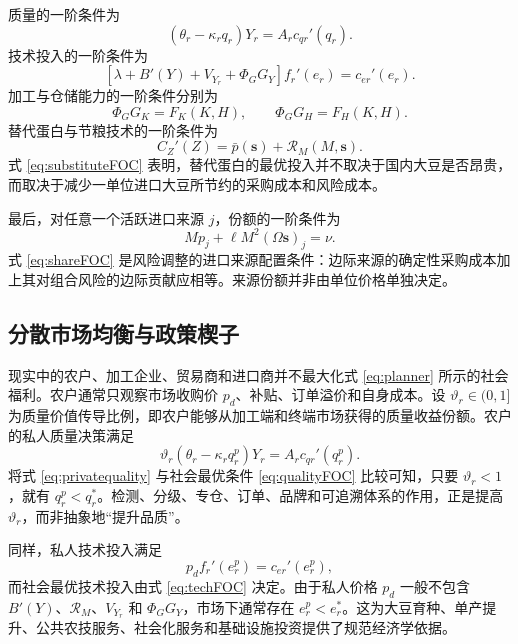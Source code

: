 \documentclass[UTF8,zihao=-4,fontset=fandol]{ctexart}
\numberwithin{equation}{section}
\theoremstyle{definition}
\theoremstyle{remark}
\begin{document}
质量的一阶条件为
\begin{equation}
 \left(\theta_r-\kappa_rq_r\right)Y_r=A_rc_{qr}'(q_r).
 \label{eq:qualityFOC}
\end{equation}
技术投入的一阶条件为
\begin{equation}
 \left[\lambda+B'(Y)+V_{Y_r}+\Phi_GG_Y\right]f_r'(e_r)=c_{er}'(e_r).
 \label{eq:techFOC}
\end{equation}
加工与仓储能力的一阶条件分别为
\begin{equation}
 \Phi_GG_K=F_K(K,H),\qquad \Phi_GG_H=F_H(K,H).
 \label{eq:capacityFOC}
\end{equation}
替代蛋白与节粮技术的一阶条件为
\begin{equation}
 C_Z'(Z)=\bar p(\bm s)+\mathcal{R}_M(M,\bm s).
 \label{eq:substituteFOC}
\end{equation}
式 \eqref{eq:substituteFOC} 表明，替代蛋白的最优投入并不取决于国内大豆是否昂贵，而取决于减少一单位进口大豆所节约的采购成本和风险成本。

最后，对任意一个活跃进口来源 $j$，份额的一阶条件为
\begin{equation}
 Mp_j+\ell M^2(\Omega\bm s)_j=\nu.
 \label{eq:shareFOC}
\end{equation}
式 \eqref{eq:shareFOC} 是风险调整的进口来源配置条件：边际来源的确定性采购成本加上其对组合风险的边际贡献应相等。来源份额并非由单位价格单独决定。

\subsection{分散市场均衡与政策楔子}

现实中的农户、加工企业、贸易商和进口商并不最大化式 \eqref{eq:planner} 所示的社会福利。农户通常只观察市场收购价 $p_d$、补贴、订单溢价和自身成本。设 $\vartheta_r\in(0,1]$ 为质量价值传导比例，即农户能够从加工端和终端市场获得的质量收益份额。农户的私人质量决策满足
\begin{equation}
 \vartheta_r\left(\theta_r-\kappa_rq_r^{p}\right)Y_r=A_rc_{qr}'(q_r^{p}).
 \label{eq:privatequality}
\end{equation}
将式 \eqref{eq:privatequality} 与社会最优条件 \eqref{eq:qualityFOC} 比较可知，只要 $\vartheta_r<1$，就有 $q_r^p<q_r^*$。检测、分级、专仓、订单、品牌和可追溯体系的作用，正是提高 $\vartheta_r$，而非抽象地“提升品质”。

同样，私人技术投入满足
\begin{equation}
 p_df_r'(e_r^p)=c_{er}'(e_r^p),
 \label{eq:privatetech}
\end{equation}
而社会最优技术投入由式 \eqref{eq:techFOC} 决定。由于私人价格 $p_d$ 一般不包含 $B'(Y)$、$\mathcal{R}_M$、$V_{Y_r}$ 和 $\Phi_GG_Y$，市场下通常存在 $e_r^p<e_r^*$。这为大豆育种、单产提升、公共农技服务、社会化服务和基础设施投资提供了规范经济学依据。
\end{document}
